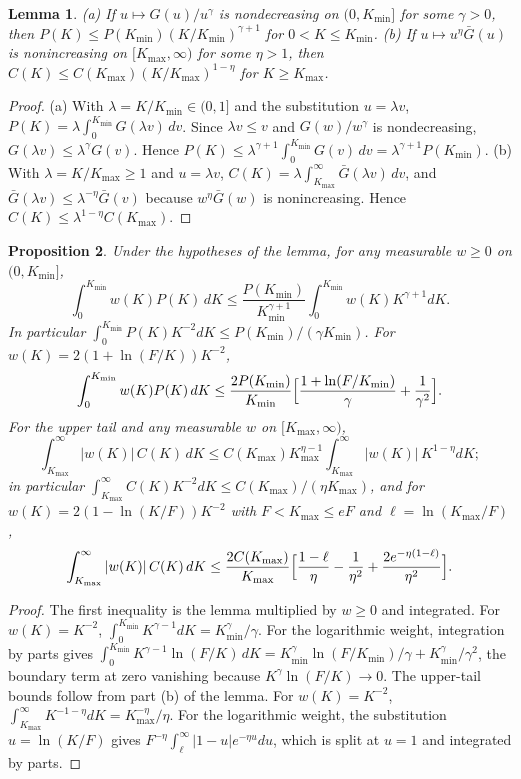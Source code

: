 \documentclass[11pt]{article}
\newtheorem{proposition}{Proposition}
\newtheorem{lemma}[proposition]{Lemma}
\theoremstyle{remark}
\begin{document}
\begin{lemma}
(a) If $u\mapsto G(u)/u^\gamma$ is nondecreasing on $(0,K_{\min}]$ for some $\gamma>0$, then $P(K)\le P(K_{\min})(K/K_{\min})^{\gamma+1}$ for $0<K\le K_{\min}$. (b) If $u\mapsto u^\eta\bar G(u)$ is nonincreasing on $[K_{\max},\infty)$ for some $\eta>1$, then $C(K)\le C(K_{\max})(K/K_{\max})^{1-\eta}$ for $K\ge K_{\max}$.
\end{lemma}

\begin{proof}
(a) With $\lambda=K/K_{\min}\in(0,1]$ and the substitution $u=\lambda v$, $P(K)=\lambda\int_0^{K_{\min}}G(\lambda v)\,dv$. Since $\lambda v\le v$ and $G(w)/w^\gamma$ is nondecreasing, $G(\lambda v)\le\lambda^\gamma G(v)$. Hence $P(K)\le\lambda^{\gamma+1}\int_0^{K_{\min}}G(v)\,dv=\lambda^{\gamma+1}P(K_{\min})$. (b) With $\lambda=K/K_{\max}\ge1$ and $u=\lambda v$, $C(K)=\lambda\int_{K_{\max}}^\infty\bar G(\lambda v)\,dv$, and $\bar G(\lambda v)\le\lambda^{-\eta}\bar G(v)$ because $w^\eta\bar G(w)$ is nonincreasing. Hence $C(K)\le\lambda^{1-\eta}C(K_{\max})$.
\end{proof}

\begin{proposition}
Under the hypotheses of the lemma, for any measurable $w\ge0$ on $(0,K_{\min}]$,
\[
\int_0^{K_{\min}}w(K)P(K)\,dK\le\frac{P(K_{\min})}{K_{\min}^{\gamma+1}}\int_0^{K_{\min}}w(K)K^{\gamma+1}dK.
\]
In particular $\int_0^{K_{\min}}P(K)K^{-2}dK\le P(K_{\min})/(\gamma K_{\min})$. For $w(K)=2(1+\ln(F/K))K^{-2}$,
\[
\int_0^{K_{\min}}w(K)P(K)\,dK\le\frac{2P(K_{\min})}{K_{\min}}\Bigl[\frac{1+\ln(F/K_{\min})}{\gamma}+\frac{1}{\gamma^2}\Bigr].
\]
For the upper tail and any measurable $w$ on $[K_{\max},\infty)$,
\[
\int_{K_{\max}}^\infty|w(K)|\,C(K)\,dK\le C(K_{\max})K_{\max}^{\eta-1}\int_{K_{\max}}^\infty|w(K)|\,K^{1-\eta}dK;
\]
in particular $\int_{K_{\max}}^\infty C(K)K^{-2}dK\le C(K_{\max})/(\eta K_{\max})$, and for $w(K)=2(1-\ln(K/F))K^{-2}$ with $F<K_{\max}\le eF$ and $\ell=\ln(K_{\max}/F)$,
\[
\int_{K_{\max}}^\infty|w(K)|\,C(K)\,dK\le\frac{2C(K_{\max})}{K_{\max}}\Bigl[\frac{1-\ell}{\eta}-\frac{1}{\eta^2}+\frac{2e^{-\eta(1-\ell)}}{\eta^2}\Bigr].
\]
\end{proposition}

\begin{proof}
The first inequality is the lemma multiplied by $w\ge0$ and integrated. For $w(K)=K^{-2}$, $\int_0^{K_{\min}}K^{\gamma-1}dK=K_{\min}^\gamma/\gamma$. For the logarithmic weight, integration by parts gives $\int_0^{K_{\min}}K^{\gamma-1}\ln(F/K)\,dK=K_{\min}^\gamma\ln(F/K_{\min})/\gamma+K_{\min}^\gamma/\gamma^2$, the boundary term at zero vanishing because $K^\gamma\ln(F/K)\to0$. The upper-tail bounds follow from part (b) of the lemma. For $w(K)=K^{-2}$, $\int_{K_{\max}}^\infty K^{-1-\eta}dK=K_{\max}^{-\eta}/\eta$. For the logarithmic weight, the substitution $u=\ln(K/F)$ gives $F^{-\eta}\int_\ell^\infty|1-u|e^{-\eta u}du$, which is split at $u=1$ and integrated by parts.
\end{proof}
\end{document}
